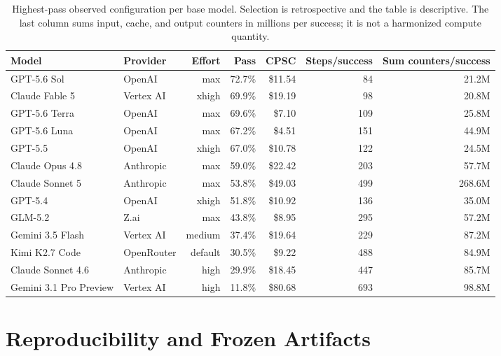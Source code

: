 \documentclass[11pt]{article}
\newcommand{\usd}[1]{\$#1}
\begin{document}
\begin{table}[H]
\centering
\scriptsize
\caption{Highest-pass observed configuration per base model. Selection is retrospective and the
table is descriptive. The last column sums input, cache, and output counters in millions per
success; it is not a harmonized compute quantity.}
\label{tab:families}
\begin{tabular}{@{}llrrrrr@{}}
\toprule
Model & Provider & Effort & Pass & CPSC & Steps/success & Sum counters/success \\
\midrule
GPT-5.6 Sol & OpenAI & max & 72.7\% & \usd{11.54} & 84 & 21.2M \\
Claude Fable 5 & Vertex AI & xhigh & 69.9\% & \usd{19.19} & 98 & 20.8M \\
GPT-5.6 Terra & OpenAI & max & 69.6\% & \usd{7.10} & 109 & 25.8M \\
GPT-5.6 Luna & OpenAI & max & 67.2\% & \usd{4.51} & 151 & 44.9M \\
GPT-5.5 & OpenAI & xhigh & 67.0\% & \usd{10.78} & 122 & 24.5M \\
Claude Opus 4.8 & Anthropic & max & 59.0\% & \usd{22.42} & 203 & 57.7M \\
Claude Sonnet 5 & Anthropic & max & 53.8\% & \usd{49.03} & 499 & 268.6M \\
GPT-5.4 & OpenAI & xhigh & 51.8\% & \usd{10.92} & 136 & 35.0M \\
GLM-5.2 & Z.ai & max & 43.8\% & \usd{8.95} & 295 & 57.2M \\
Gemini 3.5 Flash & Vertex AI & medium & 37.4\% & \usd{19.64} & 229 & 87.2M \\
Kimi K2.7 Code & OpenRouter & default & 30.5\% & \usd{9.22} & 488 & 84.9M \\
Claude Sonnet 4.6 & Anthropic & high & 29.9\% & \usd{18.45} & 447 & 85.7M \\
Gemini 3.1 Pro Preview & Vertex AI & high & 11.8\% & \usd{80.68} & 693 & 98.8M \\
\bottomrule
\end{tabular}
\end{table}

\clearpage
\section{Reproducibility and Frozen Artifacts}
\begingroup
\footnotesize
\raggedright
\end{document}
